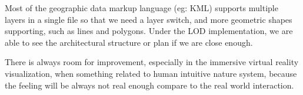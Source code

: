 Most of the geographic data markup language (eg: KML) supports multiple layers in a single file so that we need a layer switch, and more geometric shapes supporting, such as lines and polygons. Under the LOD implementation, we are able to see the architectural structure or plan if we are close enough.

There is always room for improvement, especially in the immersive virtual reality visualization, when something related to human intuitive nature system, because the feeling will be always not real enough compare to the real world interaction.

